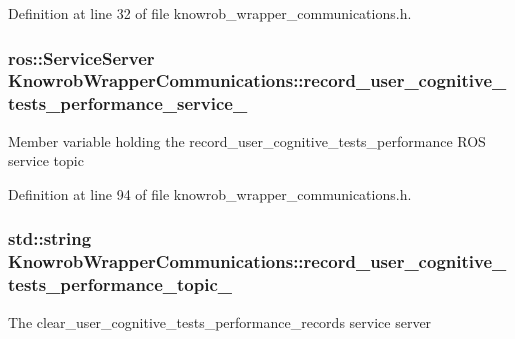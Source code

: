 Definition at line 32 of file knowrob\-\_\-wrapper\-\_\-communications.\-h.

\hypertarget{classKnowrobWrapperCommunications_a17e239928cdfac593e27e015e70ad376}{
\subsubsection[{record\-\_\-user\-\_\-cognitive\-\_\-tests\-\_\-performance\-\_\-service\-\_\-}]{\setlength{\rightskip}{0pt plus 5cm}ros\-::\-Service\-Server Knowrob\-Wrapper\-Communications\-::record\-\_\-user\-\_\-cognitive\-\_\-tests\-\_\-performance\-\_\-service\-\_\-\hspace{0.3cm}{\ttfamily [private]}}}\label{classKnowrobWrapperCommunications_a17e239928cdfac593e27e015e70ad376}
Member variable holding the record\-\_\-user\-\_\-cognitive\-\_\-tests\-\_\-performance R\-O\-S service topic 

Definition at line 94 of file knowrob\-\_\-wrapper\-\_\-communications.\-h.

\hypertarget{classKnowrobWrapperCommunications_a1e44e99eba8f3a2fb196a9d215cec89c}{
\subsubsection[{record\-\_\-user\-\_\-cognitive\-\_\-tests\-\_\-performance\-\_\-topic\-\_\-}]{\setlength{\rightskip}{0pt plus 5cm}std\-::string Knowrob\-Wrapper\-Communications\-::record\-\_\-user\-\_\-cognitive\-\_\-tests\-\_\-performance\-\_\-topic\-\_\-\hspace{0.3cm}{\ttfamily [private]}}}\label{classKnowrobWrapperCommunications_a1e44e99eba8f3a2fb196a9d215cec89c}
The clear\-\_\-user\-\_\-cognitive\-\_\-tests\-\_\-performance\-\_\-records service server 

